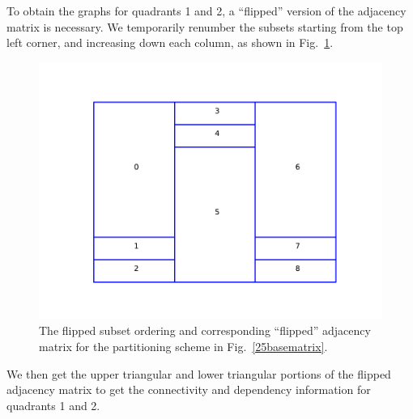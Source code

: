 \documentclass[times,final]{elsarticle}
\begin{document}
To obtain the graphs for quadrants 1 and 2, a ``flipped'' version of the adjacency matrix is necessary.
We temporarily renumber the subsets starting from the top left corner, and increasing down each column, as shown in Fig.~\ref{25flippedmatrix}.
\begin{figure}[H]
\begin{minipage}[c]{0.5\textwidth}
\centering
\includegraphics[scale=0.7]{../figures/boundaries_worst_flipped.pdf}
\end{minipage}
\begin{minipage}[c]{0.5\textwidth}
\centering
{}
\end{minipage}
\caption{The flipped subset ordering and corresponding ``flipped'' adjacency matrix for the partitioning scheme in Fig.~\ref{25basematrix}.}
\label{25flippedmatrix}
\end{figure}
We then get the upper triangular and lower triangular portions of the flipped adjacency matrix to get the connectivity and dependency information for quadrants 1 and 2.
\end{document}
